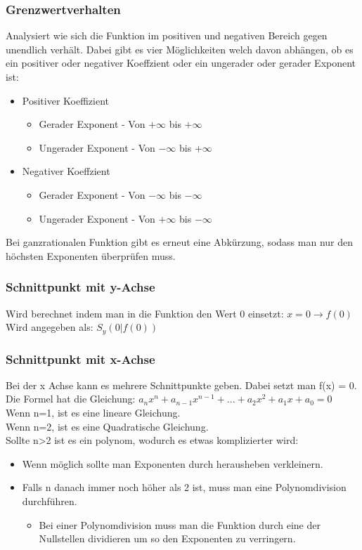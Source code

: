 \documentclass{article}
\begin{document}
	\subsubsection{Grenzwertverhalten}
	Analysiert wie sich die Funktion im positiven und negativen Bereich gegen unendlich verhält. Dabei gibt es vier Möglichkeiten welch davon abhängen, ob es ein positiver oder negativer Koeffzient oder ein ungerader oder gerader Exponent ist:
	\begin{itemize}
		\item{Positiver Koeffizient}
		\begin{itemize}
			\item{Gerader Exponent - Von $+\infty$ bis $+\infty$}
			\item{Ungerader Exponent - Von $-\infty$ bis $+\infty$}
		\end{itemize}
		\item{Negativer Koeffzient}
		\begin{itemize}
			\item{Gerader Exponent - Von $-\infty$ bis $-\infty$}
			\item{Ungerader Exponent - Von $+\infty$ bis $-\infty$}
		\end{itemize}
	\end{itemize}
	Bei ganzrationalen Funktion gibt es erneut eine Abkürzung, sodass man nur den höchsten Exponenten überprüfen muss.
	\subsubsection{Schnittpunkt mit y-Achse}
	Wird berechnet indem man in die Funktion den Wert 0 einsetzt: $x=0\to f(0)$ \\
	Wird angegeben als: $S_y(0|f(0))$
	\subsubsection{Schnittpunkt mit x-Achse}
	Bei der x Achse kann es mehrere Schnittpunkte geben. Dabei setzt man f(x) = 0. \\
	Die Formel hat die Gleichung: $a_nx^n+a_{n-1}x^{n-1}+...+a_2x^2+a_1x+a_0=0$
	Wenn n=1, ist es eine lineare Gleichung. \\
	Wenn n=2, ist es eine Quadratische Gleichung. \\
	Sollte n>2 ist es ein polynom, wodurch es etwas komplizierter wird:
	\begin{itemize}
		\item{Wenn möglich sollte man Exponenten durch herausheben verkleinern.}
		\item{Falls n danach immer noch höher als 2 ist, muss man eine Polynomdivision durchführen.}
		\begin{itemize}
			\item{Bei einer Polynomdivision muss man die Funktion durch eine der Nullstellen dividieren um so den Exponenten zu verringern.}
		\end{itemize}
	\end{itemize}
\end{document}
